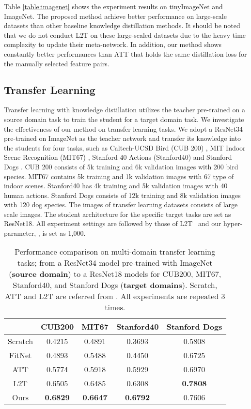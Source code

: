 Table \ref{table:imagenet} shows the experiment results on tinyImageNet and ImageNet. The proposed method achieve better performance on large-scale datasets than other baseline knowledge distillation methods. It should be noted that we do not conduct L2T on these large-scaled datasets due to the heavy time complexity to update their meta-network. In addition, our method shows constantly better performances than ATT that holds the same distillation loss for the manually selected feature pairs.

\subsection{Transfer Learning}

Transfer learning with knowledge distillation utilizes the teacher pre-trained on a source domain task to train the student for a target domain task. We investigate the effectiveness of our method on transfer learning tasks. We adopt a ResNet34 pre-trained on ImageNet as the teacher network and transfer its knowledge into the students for four tasks, such as Caltech-UCSD Bird (CUB 200) \cite{cub}, MIT Indoor Scene Recognition (MIT67) \cite{mit67}, Stanford 40 Actions (Stanford40) \cite{stan40} and Stanford Dogs \cite{stan_dog}. CUB 200 consists of 5k training and 6k validation images with 200 bird species. MIT67 contains 5k training and 1k validation images with 67 type of indoor scenes. Stanford40 has 4k training and 5k validation images with 40 human actions. Stanford Dogs consists of 12k training and 8k validation images with 120 dog species. The images of transfer learning datasets consists of large scale images. The student architecture for the specific target tasks are set as ResNet18. All experiment settings are followed by those of L2T~\cite{l2t} and our hyper-parameter, , is set as 1,000.

\begin{table}[h]
\centering
\begin{tabular}{c|cccc}
\toprule
        & \small{CUB200} & \small{MIT67}  & \small{Stanford40} & \small{Stanford Dogs} \\ \midrule
Scratch & 0.4215 & 0.4891 & 0.3693     & 0.5808        \\ 
FitNet  & 0.4893 & 0.5488 & 0.4450     & 0.6725        \\
ATT     & 0.5774 & 0.5918 & 0.5929     & 0.6970        \\
L2T     & 0.6505 & 0.6485 & 0.6308     & \textbf{0.7808}        \\ \midrule
Ours    & \textbf{0.6829} & \textbf{0.6647} & \textbf{0.6792}     & 0.7606             \\ \bottomrule 
\end{tabular}
\vspace{0.3em}
\caption{Performance comparison on multi-domain transfer learning tasks; from a ResNet34 model pre-trained with ImageNet (\textbf{source domain}) to a ResNet18 models for CUB200, MIT67, Stanford40, and Stanford Dogs (\textbf{target domains}). Scratch, ATT and L2T are referred from \cite{l2t}. All experiments are repeated 3 times.}
\label{table:multi-domain}
\end{table}

